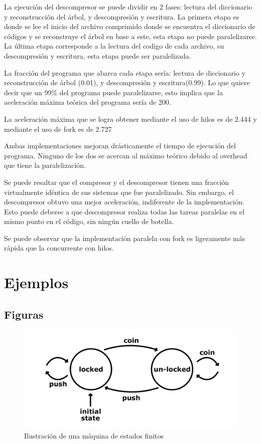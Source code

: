 \documentclass{report}
\begin{document}
La ejecución del descompresor se puede dividir en 2 fases: lectura del diccionario y reconstrucción del árbol, y descompresión y escritura. La primera etapa es donde se lee el inicio del archivo comprimido donde se encuentra el diccionario de códigos y se reconstruye el árbol en base a este, esta etapa no puede paralelizarse. La última etapa corresponde a la lectura del codigo de cada archivo, su descompresión y escritura, esta etapa puede ser paralelizada. 

La fracción del programa que abarca cada etapa sería: lectura de diccionario y reconstrucción de árbol (0.01), y descompresión y escritura(0.99).  Lo que quiere decir que un 99\% del programa puede paralelizarse, esto implica que la aceleración máxima teórica del programa sería de 200.

La aceleración máxima que se logra obtener mediante el uso de hilos es de 2.444 y mediante el uso de fork es de 2.727 

Ambas implementaciones mejoran drásticamente el tiempo de ejecución del programa. Ninguno de los dos se acercan al máximo teórico debido al overhead que tiene la paralelización.

 Se puede resaltar que el compresor y el descompresor tienen una fracción virtualmente idéntica de sus sistemas que fue paralelizado. Sin embargo, el descompresor obtuvo una mejor aceleración, indiferente de la implementación. Esto puede deberse a que descompresor realiza todas las tareas paralelas en el mismo punto en el código, sin ningún cuello de botella.

Se puede observar que la implementación paralela con fork es ligeramente más rápida que la  concurrente con hilos.


\chapter{Ejemplos}\label{ejemplos}

\section{Figuras}\label{figuras}
\begin{figure}
    \centering
    \includegraphics[width=0.8\linewidth]{figuras/maquinaDeEstados.jpg}
    \caption{Ilustración de una máquina de estados finitos}
    \label{fig:msf}
\end{figure}
\end{document}

